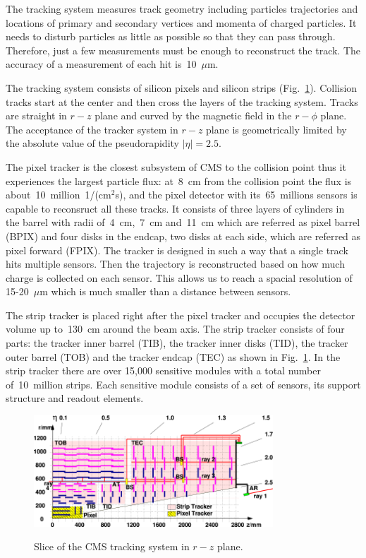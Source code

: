 The tracking system measures track geometry including particles trajectories and locations of primary and secondary vertices and momenta of charged particles. It needs to disturb particles as little as possible so that they can pass through. Therefore, just a few measurements must be enough to reconstruct the track. The accuracy of a measurement of each hit is~10~$\mu$m.

The tracking system consists of silicon pixels and silicon strips (Fig.~\ref{fig:tracker_slice}). Collision tracks start at the center and then cross the layers of the tracking system. Tracks are straight in $r-z$ plane and curved by the magnetic field in the $r-\phi$ plane. The acceptance of the tracker system in $r-z$ plane is geometrically limited by the absolute value of the pseudorapidity $|\eta|=2.5$.

The pixel tracker is the closest subsystem of CMS to the collision point thus it experiences the largest particle flux: at~8~cm from the collision point the flux is about~10~million~1/(cm$^2$s), and the pixel detector with its~65~millions sensors is capable to reconsruct all these tracks. It consists of three layers of cylinders in the barrel with radii of~4~cm,~7~cm and~11~cm which are referred as pixel barrel (BPIX) and four disks in the endcap, two disks at each side, which are referred as pixel forward (FPIX). The tracker is designed in such a way that a single track hits multiple sensors. Then the trajectory is reconstructed based on how much charge is collected on each sensor. This allows us to reach a spacial resolution of 15-20~$\mu$m which is much smaller than a distance between sensors.

The strip tracker is placed right after the pixel tracker and occupies the detector volume up to~130~cm around the beam axis. The strip tracker consists of four parts: the tracker inner barrel (TIB), the tracker inner disks (TID), the tracker outer barrel (TOB) and the tracker endcap (TEC) as shown in Fig.~\ref{fig:tracker_slice}. In the strip tracker there are over 15,000 sensitive modules with a total number of~10~million strips. Each sensitive module consists of a set of sensors, its support structure and readout elements.



\begin{figure}[htb]
  \begin{center}
    {\includegraphics[width=0.8\textwidth]{../figs/Exp/tracker_slice.png}}
    \caption{Slice of the CMS tracking system in $r-z$ plane.}
    \label{fig:tracker_slice}
  \end{center}
\end{figure}

